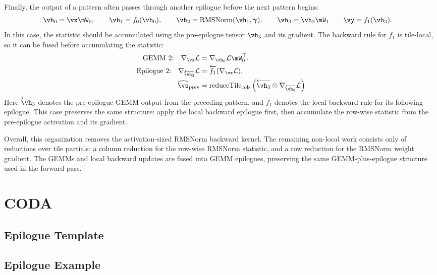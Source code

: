Finally, the output of a pattern often passes through another epilogue before the next pattern begins:
\begin{align*}
\vh_0 &= \vx \mW_0, \qquad
\vh_1 = f_0(\vh_0), \qquad
\vh_2 = \operatorname{RMSNorm}(\vh_1, \boldsymbol{\gamma}), \qquad
\vh_3 = \vh_2 \mW_1
\qquad \vy = f_1(\vh_3).
\end{align*}
In this case, the statistic should be accumulated using the pre-epilogue tensor $\vh_3$ and its gradient. The backward rule for $f_1$ is tile-local, so it can be fused before accumulating the statistic:
\begin{align*}
\text{GEMM 2:}\quad
\nabla_{\vx}\mathcal{L}
&=
\nabla_{\vh_0}\mathcal{L}\mW_0^\top, \\
\text{Epilogue 2:}\quad
\nabla_{\overleftarrow{\vh_3}}\mathcal{L}
&=
\overleftarrow{f_1}(\nabla_{\vx}\mathcal{L}), \\
\widehat{\vs}_{\mathrm{prev}}
&=
\operatorname{reduceTile}_{\mathrm{cols}}
\left(
\overleftarrow{\vh_3} \odot \nabla_{\overleftarrow{\vh_3}}\mathcal{L}
\right)
\end{align*}
Here $\overleftarrow{\vh_3}$ denotes the pre-epilogue GEMM output from the preceding pattern, and $\overleftarrow{f_1}$ denotes the local backward rule for its following epilogue. This case preserves the same structure: apply the local backward epilogue first, then accumulate the row-wise statistic from the pre-epilogue activation and its gradient.

Overall, this organization removes the activation-sized RMSNorm backward kernel. The remaining non-local work consists only of reductions over tile partials: a column reduction for the row-wise RMSNorm statistic, and a row reduction for the RMSNorm weight gradient. The GEMMs and local backward updates are fused into GEMM epilogues, preserving the same GEMM-plus-epilogue structure used in the forward pass.

\section{CODA}
\subsection{Epilogue Template}
\label{label:evt-template}

\subsection{Epilogue Example}
\label{label:evt-example}


